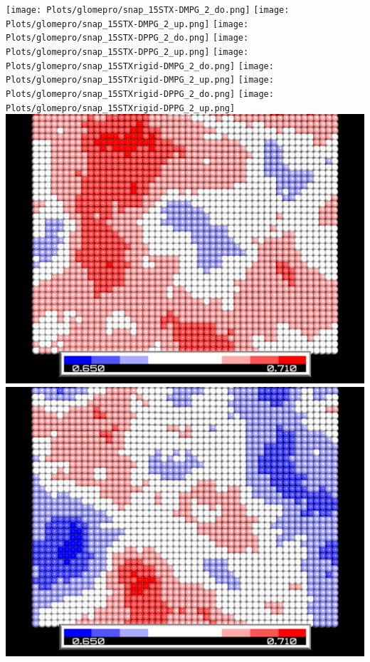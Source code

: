 \begin{center}
\texttt{[image: Plots/glomepro/snap\_15STX-DMPG\_2\_do.png]}
\texttt{[image: Plots/glomepro/snap\_15STX-DMPG\_2\_up.png]}
\texttt{[image: Plots/glomepro/snap\_15STX-DPPG\_2\_do.png]}
\texttt{[image: Plots/glomepro/snap\_15STX-DPPG\_2\_up.png]}
\texttt{[image: Plots/glomepro/snap\_15STXrigid-DMPG\_2\_do.png]}
\texttt{[image: Plots/glomepro/snap\_15STXrigid-DMPG\_2\_up.png]}
\texttt{[image: Plots/glomepro/snap\_15STXrigid-DPPG\_2\_do.png]}
\texttt{[image: Plots/glomepro/snap\_15STXrigid-DPPG\_2\_up.png]}
\includegraphics[resolution=100,scale=0.01]{Plots/glomepro/snap_STX-DMPG_2_do.png}
\includegraphics[resolution=100,scale=0.01]{Plots/glomepro/snap_STX-DMPG_2_up.png}

\end{center}
